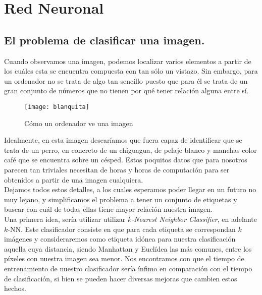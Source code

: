 
\chapter{Red Neuronal}
\section{El problema de clasificar una imagen.}

Cuando observamos una imagen, podemos localizar varios elementos a partir de los cuáles esta se encuentra compuesta con tan sólo un vistazo. Sin embargo, para un ordenador no se trata de algo tan sencillo puesto que para él se trata de un gran conjunto de números que no tienen por qué tener relación alguna entre sí.\\

\begin{figure}[htpb]
  \centering
  \texttt{[image: blanquita]}
  \caption{Cómo un ordenador ve una imagen}
  \label{fig:blanquita}
\end{figure}

Idealmente, en esta imagen desearíamos que fuera capaz de identificar que se trata de un perro, en concreto de un chiguagua, de pelaje blanco y manchas color café que se encuentra sobre un césped. Estos poquitos datos que para nosotros parecen tan triviales necesitan de horas y horas de computación para ser obtenidos a partir de una imagen cualquiera.\\

Dejamos todos estos detalles, a los cuales esperamos poder llegar en un futuro no muy lejano, y simplificamos el problema a tener un conjunto de etiquetas y buscar con cuál de todas ellas tiene mayor relación nuestra imagen.\\

Una primera idea, sería utilizar utilizar \emph{$k$-Nearest Neighbor Classifier}, en adelante $k$-NN. Este clasificador consiste en que para cada etiqueta se correspondan $k$ imágenes y consideraremos como etiqueta idónea para nuestra clasificación aquella cuya distancia, siendo Manhattan y Euclídea las más comunes, entre los píxeles con nuestra imagen sea menor. Nos encontramos con que el tiempo de entrenamiento de nuestro clasificador sería ínfimo en comparación con el tiempo de clasificación, si bien se pueden hacer diversas mejoras que cambien estos hechos. \\

